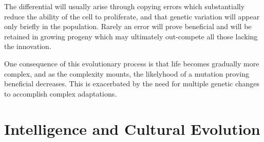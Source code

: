 {The differential will usually arise through copying errors which substantially reduce the ability of the cell to proliferate, and that genetic variation will appear only briefly in the population.
Rarely an error will prove beneficial and will be retained in growing progeny which may ultimately out-compete all those lacking the innovation.

One consequence of this evolutionary process is that life becomes gradually more complex, and as the complexity mounts, the likelyhood of a mutation proving beneficial decreases.
This is exacerbated by the need for multiple genetic changes to accomplish complex adaptations.

\section{Intelligence and Cultural Evolution}
}%
